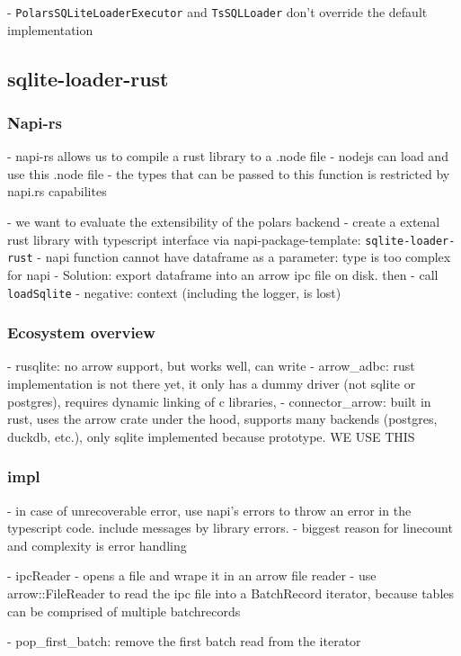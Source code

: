 - \Verb|PolarsSQLiteLoaderExecutor| and \Verb|TsSQLLoader| don't override the default implementation

\subsection{sqlite-loader-rust}

\subsubsection{Napi-rs}
- napi-rs allows us to compile a rust library to a .node file
- nodejs can load and use this .node file
- the types that can be passed to this function is restricted by napi.rs capabilites

- we want to evaluate the extensibility of the polars backend
- create a extenal rust library with typescript interface via napi-package-template: \Verb|sqlite-loader-rust|
- napi function cannot have dataframe as a parameter: type is too complex for napi
- Solution: export dataframe into an arrow ipc file on disk. then
- call \Verb|loadSqlite|
- negative: context (including the logger, is lost)

\subsubsection{Ecosystem overview}
- rusqlite: no arrow support, but works well, can write
- arrow\_adbc: rust implementation is not there yet, it only has a dummy driver (not sqlite or postgres), requires dynamic linking of c libraries,
- connector\_arrow: built in rust, uses the arrow crate under the hood, supports many backends (postgres, duckdb, etc.), only sqlite implemented because prototype. WE USE THIS

\subsubsection{impl}
- in case of unrecoverable error, use napi's errors to throw an error in the typescript code. include messages by library errors.
- biggest reason for linecount and complexity is error handling

- ipcReader
- opens a file and wrape it in an arrow file reader
- use arrow::FileReader to read the ipc file into a BatchRecord iterator, because tables can be comprised of multiple batchrecords

- pop_first_batch: remove the first batch read from the iterator

